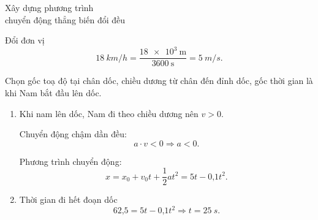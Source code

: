 \begin{dang}{Xây dựng phương trình\\ chuyển động thẳng biến đổi đều}
{		Đổi đơn vị $$\SI{18}{km/h} = \dfrac{\SI{18e3}{\meter}}{\SI{3600}{\second}}=\SI{5}{m/s}.$$
		
		Chọn gốc toạ độ tại chân dốc, chiều dương từ chân đến đỉnh dốc, gốc thời gian là khi Nam bắt đầu lên dốc.
		\begin{enumerate}[label=\alph*.]
			\item Khi nam lên dốc, Nam đi theo chiều dương nên $v>0$.
			
			Chuyển động chậm dần đều: 
			$$a\cdot v<0 \Rightarrow a<0.$$
			
			Phương trình chuyển động:
			$$x =x_0 +v_0t+\dfrac{1}{2}at^2 = 5t - \text{0,1}t^2.$$
			\item Thời gian đi hết đoạn dốc
			$$\text{62,5} =5t - \text{0,1}t^2 \Rightarrow t = \SI{25}{s}.$$
		\end{enumerate}
	}
\end{dang}


